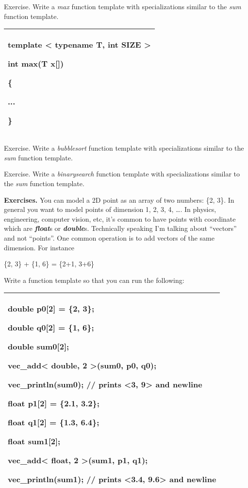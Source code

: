 \documentclass[
]{article}
\begin{document}
Exercise. Write a \emph{max} function template with specializations
similar to the \emph{sum} function template.

\begin{longtable}[]{@{}l@{}}
\toprule
\endhead
\begin{minipage}[t]{0.97\columnwidth}\raggedright
template \textless{} typename T, int SIZE \textgreater{}

int max(T x{[}{]})

\{

...

\}\strut
\end{minipage}\tabularnewline
\bottomrule
\end{longtable}

Exercise. Write a \emph{bubblesort} function template with
specializations similar to the \emph{sum} function template.

Exercise. Write a \emph{binarysearch} function template with
specializations similar to the \emph{sum} function template.

\textbf{Exercises.} You can model a 2D point as an array of two numbers:
\{2, 3\}. In general you want to model points of dimension 1, 2, 3, 4,
\ldots. In physics, engineering, computer vision, etc, it's common to
have points with coordinate which are \emph{\textbf{float}}s or
\emph{\textbf{double}}s. Technically speaking I'm talking about
``vectors'' and not ``points''. One common operation is to add vectors
of the same dimension. For instance

\{2, 3\} + \{1, 6\} = \{2+1, 3+6\}

Write a function template so that you can run the following:

\begin{longtable}[]{@{}l@{}}
\toprule
\endhead
\begin{minipage}[t]{0.97\columnwidth}\raggedright
double p0{[}2{]} = \{2, 3\};

double q0{[}2{]} = \{1, 6\};

double sum0{[}2{]};

vec\_add\textless{} double, 2 \textgreater(sum0, p0, q0);

vec\_println(sum0); // prints \textless3, 9\textgreater{} and newline

float p1{[}2{]} = \{2.1, 3.2\};

float q1{[}2{]} = \{1.3, 6.4\};

float sum1{[}2{]};

vec\_add\textless{} float, 2 \textgreater(sum1, p1, q1);

vec\_println(sum1); // prints \textless3.4, 9.6\textgreater{} and
newline\strut
\end{minipage}\tabularnewline
\bottomrule
\end{longtable}
\end{document}
